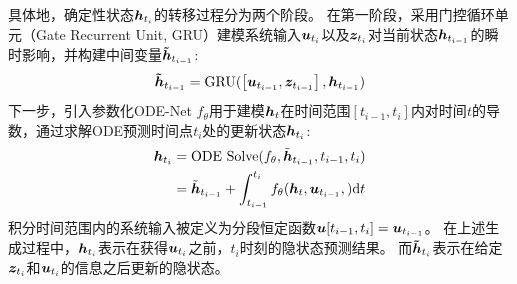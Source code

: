 具体地，确定性状态$\boldsymbol{h}_{t_i}$的转移过程分为两个阶段。
在第一阶段，采用门控循环单元（Gate Recurrent Unit, GRU）建模系统输入$\boldsymbol{u}_{t_i}$以及$\boldsymbol{z}_{t_i}$对当前状态$\boldsymbol{h}_{t_{i-1}}$的瞬时影响，并构建中间变量$\boldsymbol{\tilde{h}}_{t_{i-1}}$:
\begin{equation}
\thtm  = \text{GRU}(\left [\utm, \ztm\right], \htm)
\label{equ:gru}
\end{equation}
下一步，引入参数化ODE-Net $f_\theta$用于建模$\boldsymbol h_{t}$在时间范围$[t_{i-1},t_{i}]$内对时间$t$的导数，通过求解ODE预测时间点$t_i$处的更新状态$\boldsymbol{h}_{t_i}$:
\begin{equation}
\begin{aligned}
   \hti&=\text{ODE Solve}(f_\theta, \tilde{\b{h}}_{t_{i-1}}, t_{i-1}, t_i) \\
   &= \tilde{\b{h}}_{t_{i-1}} + \int_{t_{i-1}}^{t_i}f_\theta(\b h_t, \utm, ) \text{d}t
   \label{equ:ode}
\end{aligned}
\end{equation}
积分时间范围内的系统输入被定义为分段恒定函数$\boldsymbol u[t_{i-1},t_i]=\boldsymbol{u}_{t_{i-1}}$。
在上述生成过程中，$\boldsymbol{h}_{t_i}$表示在获得$\boldsymbol{u}_{t_i}$之前，$t_i$时刻的隐状态预测结果。
而$\boldsymbol{\tilde{h}}_{t_i}$表示在给定$\boldsymbol{z}_{t_i}$和$\boldsymbol{u}_{t_i}$的信息之后更新的隐状态。

